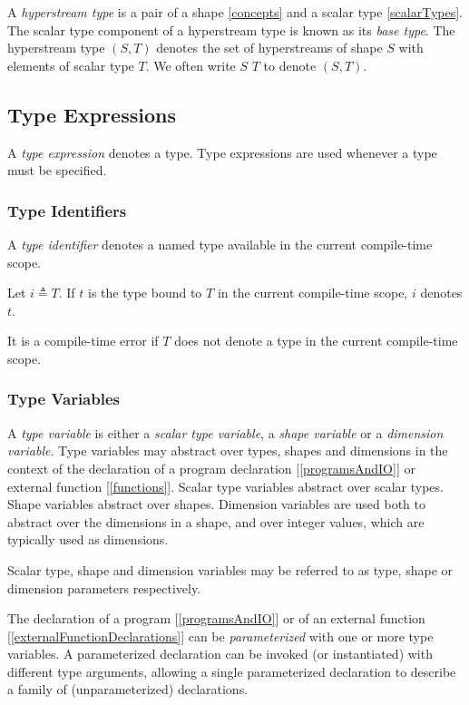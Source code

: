 \documentclass{article}
\begin{document}
A {\em hyperstream type} is a pair of a shape \ref{concepts} and a scalar type \ref{scalarTypes}. The scalar type component of a hyperstream type is known as its {\em base type}. The hyperstream type $(S,  T)$ denotes the set of hyperstreams of shape $S$ with elements of scalar type $T$. We often write $S$ $T$ to denote $(S,  T)$.


\subsection{Type Expressions}
\label{typeExpressions}

A {\em type expression} denotes a type. Type expressions are used whenever a type must be specified.


\subsubsection{Type Identifiers}
\label{typeIdentifiers}

A {\em type identifier} denotes a named type available in the current compile-time scope.

Let $i \triangleq T$. If $t$ is the type bound to $T$ in the current compile-time scope, $i$ denotes $t$. 

It is a compile-time error if $T$ does not denote a type in the current compile-time scope.

\subsubsection{Type Variables}
\label{typeVariables}

A {\em type variable} is either a {\em scalar type variable}, a {\em shape variable} or a {\em dimension variable}. Type variables may abstract over types, shapes and dimensions in the context of the declaration of a program declaration [\ref{programsAndIO}] or external function [\ref{functions}]. Scalar type variables abstract over  scalar types. Shape variables abstract over shapes. Dimension variables are used both to abstract over the dimensions in a shape, and over integer values, which are typically used as dimensions.

Scalar type, shape and dimension variables may be referred to as type, shape or dimension parameters respectively.

 The declaration of a program [\ref{programsAndIO}] or of an external function [\ref{externalFunctionDeclarations}] can be {\em parameterized} with one or more type variables. A parameterized declaration can be invoked (or instantiated) with different type arguments, allowing a single parameterized declaration to describe a family of (unparameterized) declarations. 
 
\end{document}
